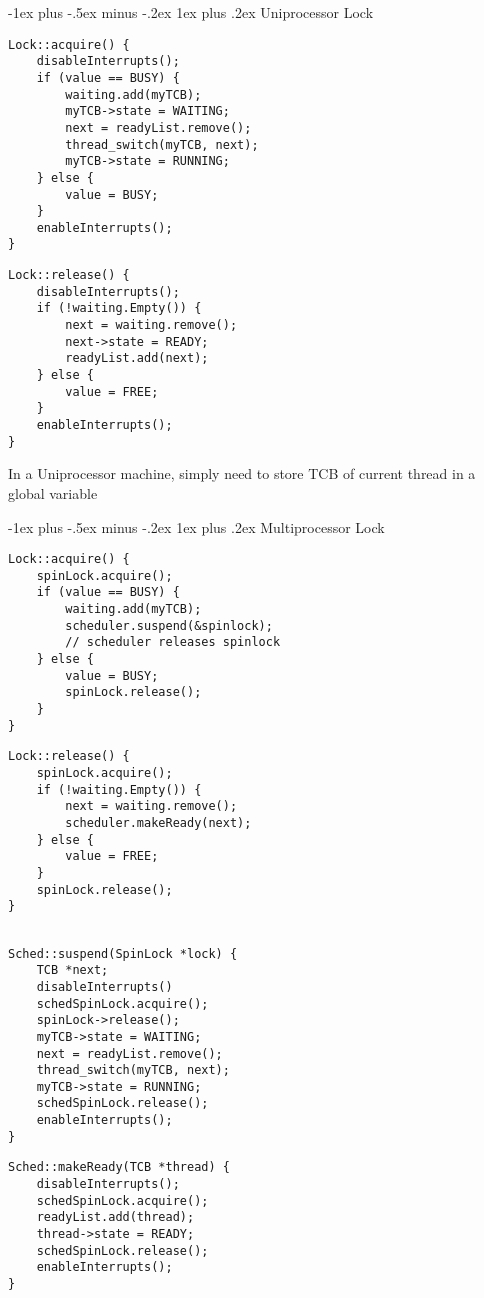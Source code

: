\documentclass[8pt,landscape]{article}
\makeatletter
\renewcommand{\subsubsection}{\@startsection{subsubsection}{3}{0mm}%
                                {-1ex plus -.5ex minus -.2ex}%
                                {1ex plus .2ex}%
                                {\normalfont\small\bfseries}}
\makeatother
\begin{document}
\begin{multicols}{3}
\subsubsection{Uniprocessor Lock}
\begin{multicols}{2}
\begin{lstlisting}
Lock::acquire() { 
    disableInterrupts(); 
    if (value == BUSY) { 
        waiting.add(myTCB);
        myTCB->state = WAITING;
        next = readyList.remove();
        thread_switch(myTCB, next);
        myTCB->state = RUNNING;
    } else { 
        value = BUSY; 
    } 
    enableInterrupts(); 
}
\end{lstlisting}
\columnbreak
\begin{lstlisting}[belowskip=0pt]
Lock::release() { 
    disableInterrupts();
    if (!waiting.Empty()) { 
        next = waiting.remove();
        next->state = READY;    
        readyList.add(next); 
    } else {
        value = FREE; 
    } 
    enableInterrupts(); 
} 
\end{lstlisting}
\tiny{In a Uniprocessor machine, simply need to store TCB of current thread in a global variable}
\end{multicols}
\subsubsection{Multiprocessor Lock}
\begin{multicols}{2}
\begin{lstlisting}
Lock::acquire() { 
    spinLock.acquire();
    if (value == BUSY) { 
        waiting.add(myTCB);
        scheduler.suspend(&spinlock);
        // scheduler releases spinlock
    } else { 
        value = BUSY; 
        spinLock.release();
    }
}
\end{lstlisting}
\columnbreak
\begin{lstlisting}
Lock::release() { 
    spinLock.acquire();
    if (!waiting.Empty()) { 
        next = waiting.remove();    
        scheduler.makeReady(next);
    } else {
        value = FREE; 
    } 
    spinLock.release();
} 
     
\end{lstlisting}
\end{multicols}
\begin{multicols}{2}
\begin{lstlisting}
Sched::suspend(SpinLock *lock) { 
    TCB *next; 
    disableInterrupts()
    schedSpinLock.acquire();
    spinLock->release();
    myTCB->state = WAITING;
    next = readyList.remove();
    thread_switch(myTCB, next);
    myTCB->state = RUNNING; 
    schedSpinLock.release();
    enableInterrupts(); 
}
\end{lstlisting}
\columnbreak
\begin{lstlisting}
Sched::makeReady(TCB *thread) { 
    disableInterrupts();
    schedSpinLock.acquire();
    readyList.add(thread);
    thread->state = READY;
    schedSpinLock.release();
    enableInterrupts();
}
\end{lstlisting}
\end{multicols}







\end{multicols}
\end{document}
